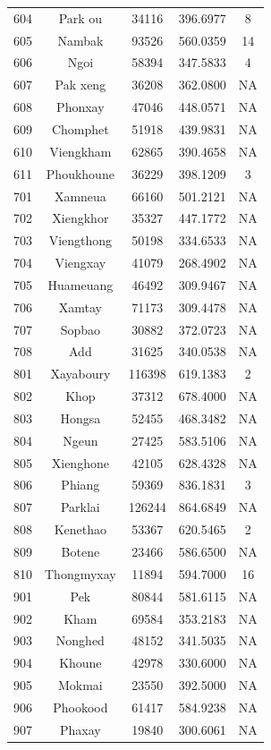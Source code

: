 \documentclass[
  letterpaper,
  DIV=11,
  numbers=noendperiod]{scrartcl}
\begin{document}
\begin{longtable}[]{@{}ccccc@{}}
604 & Park ou & 34116 & 396.6977 & 8 \\
605 & Nambak & 93526 & 560.0359 & 14 \\
606 & Ngoi & 58394 & 347.5833 & 4 \\
607 & Pak xeng & 36208 & 362.0800 & NA \\
608 & Phonxay & 47046 & 448.0571 & NA \\
609 & Chomphet & 51918 & 439.9831 & NA \\
610 & Viengkham & 62865 & 390.4658 & NA \\
611 & Phoukhoune & 36229 & 398.1209 & 3 \\
701 & Xamneua & 66160 & 501.2121 & NA \\
702 & Xiengkhor & 35327 & 447.1772 & NA \\
703 & Viengthong & 50198 & 334.6533 & NA \\
704 & Viengxay & 41079 & 268.4902 & NA \\
705 & Huameuang & 46492 & 309.9467 & NA \\
706 & Xamtay & 71173 & 309.4478 & NA \\
707 & Sopbao & 30882 & 372.0723 & NA \\
708 & Add & 31625 & 340.0538 & NA \\
801 & Xayaboury & 116398 & 619.1383 & 2 \\
802 & Khop & 37312 & 678.4000 & NA \\
803 & Hongsa & 52455 & 468.3482 & NA \\
804 & Ngeun & 27425 & 583.5106 & NA \\
805 & Xienghone & 42105 & 628.4328 & NA \\
806 & Phiang & 59369 & 836.1831 & 3 \\
807 & Parklai & 126244 & 864.6849 & NA \\
808 & Kenethao & 53367 & 620.5465 & 2 \\
809 & Botene & 23466 & 586.6500 & NA \\
810 & Thongmyxay & 11894 & 594.7000 & 16 \\
901 & Pek & 80844 & 581.6115 & NA \\
902 & Kham & 69584 & 353.2183 & NA \\
903 & Nonghed & 48152 & 341.5035 & NA \\
904 & Khoune & 42978 & 330.6000 & NA \\
905 & Mokmai & 23550 & 392.5000 & NA \\
906 & Phookood & 61417 & 584.9238 & NA \\
907 & Phaxay & 19840 & 300.6061 & NA \\

\end{longtable}
\end{document}
